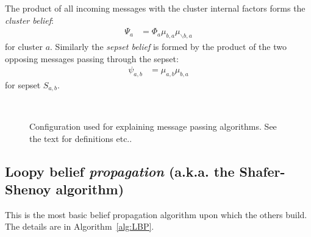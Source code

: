 \documentclass[oneside,english]{scrbook}
\begin{document}
The product of all incoming messages with the cluster internal factors
forms the \emph{cluster belief}:
\begin{align}
  \Psi_a &= \Phi_a \mu_{b,a} \mu_{\backslash b,a} \label{eq:clusterbelief}
\end{align}
for cluster $a$. Similarly the \emph{sepset
  belief} is formed by the product of the two opposing messages
passing through the sepset:
\begin{align}
  \psi_{a,b} &= \mu_{a,b}\mu_{b,a} \label{eq:sepsetbelief}
\end{align}
for sepset $S_{a,b}$.

\begin{figure}[b]
  \begin{centering}
    \\
    \caption{Configuration used for explaining message passing
      algorithms. See the text for definitions etc..\label{fig:msgpassing} }
  \end{centering}
\end{figure}
\FloatBarrier

\subsection{Loopy belief \emph{propagation} (a.k.a. the Shafer-Shenoy algorithm)}
This is the most basic belief propagation algorithm upon which the
others build. The details are in Algorithm~\ref{alg:LBP}.
\end{document}
